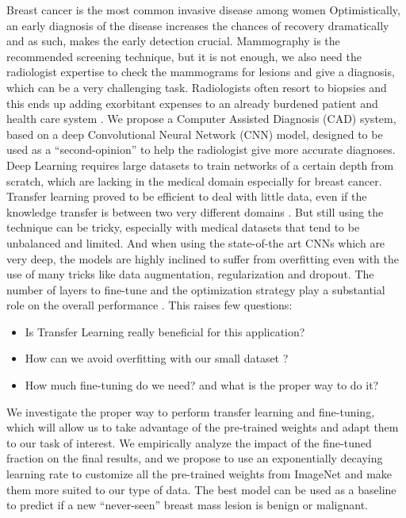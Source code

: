 \documentclass{article}
\begin{document}
Breast cancer is the most common invasive disease among women \citep{siegel2014cancer}
Optimistically, an early diagnosis of the disease increases the chances of recovery dramatically and as such, makes the early detection crucial. Mammography is the recommended screening technique, but it is not enough, we also need the radiologist expertise to check the mammograms for lesions and give a diagnosis, which can be a very challenging task\citep{kerlikowske2000performance}. 
Radiologists often resort to biopsies and this ends up adding exorbitant expenses to an already burdened patient and health care system \citep{sickles1991periodic}. 
We propose a Computer Assisted Diagnosis (CAD) system, based on a deep Convolutional Neural Network (CNN) model, designed to be used as a “second-opinion” to help the radiologist give more accurate diagnoses. Deep Learning requires large datasets to train networks of a certain depth from scratch, which are lacking in the medical domain especially for breast cancer. Transfer learning proved to be efficient to deal with little data, even if the knowledge transfer is between two very different domains \citep{shin2016deep}. 
But still using the technique can be tricky, especially with medical datasets that tend to be unbalanced and limited. And when using the state-of-the art CNNs which are very deep, the models are highly inclined to suffer from overfitting even with the use of many tricks like data augmentation, regularization and dropout.
The number of layers to fine-tune and the optimization strategy play a substantial role on the overall performance  \citep{yosinski2014transferable}. This raises few questions:
\begin{itemize}
\item Is Transfer Learning really beneficial for this application?
\item How can we avoid overfitting with our small dataset ?
\item How much fine-tuning do we need? and what is the proper way to do it?
\end{itemize}
We investigate the proper way to perform transfer learning and fine-tuning, which will allow us to take advantage of the pre-trained weights and adapt them to our task of interest. We empirically analyze the impact of the fine-tuned fraction on the final results, and we propose to use an exponentially decaying learning rate to customize all the pre-trained weights from ImageNet\citep{deng2009imagenet} and make them more suited to our type of data. The best model can be used as a baseline to predict if a new “never-seen” breast mass lesion is benign or malignant.
\end{document}
